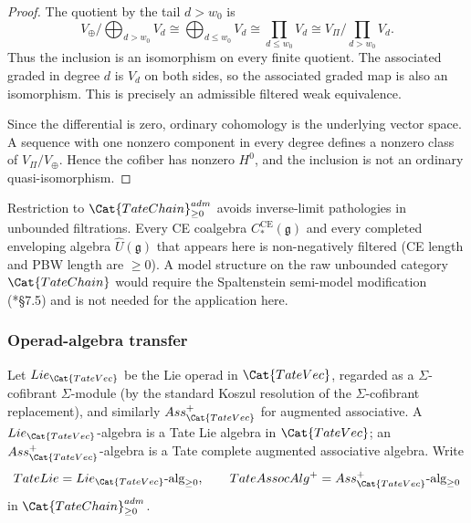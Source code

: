 \begin{proof}
  The quotient by the tail \(d>w_0\) is
  \[
    V_{\oplus}/\bigoplus_{d>w_0}V_d
      \cong \bigoplus_{d\leq w_0}V_d
      \cong \prod_{d\leq w_0}V_d
      \cong V_{\Pi}/\prod_{d>w_0}V_d .
  \]
  Thus the inclusion is an isomorphism on every finite quotient.  The
  associated graded in degree \(d\) is \(V_d\) on both sides, so the
  associated graded map is also an isomorphism.  This is precisely an
  admissible filtered weak equivalence.

  Since the differential is zero, ordinary cohomology is the underlying
  vector space.  A sequence with one nonzero component in every degree
  defines a nonzero class of \(V_{\Pi}/V_{\oplus}\).  Hence the cofiber
  has nonzero \(H^0\), and the inclusion is not an ordinary
  quasi-isomorphism.
\end{proof}

\begin{rmk}
  Restriction to $\Cat{TateChain}_{\geq 0}^{\mathrm{adm}}$ avoids inverse-limit
  pathologies in unbounded filtrations. Every CE coalgebra
  $C_*^{\mathrm{CE}}(\mathfrak g)$ and every completed enveloping
  algebra $\widehat U(\mathfrak g)$ that appears here is
  non-negatively filtered (CE length and PBW length are
  $\geq 0$). A model structure on the raw unbounded category
  $\Cat{TateChain}$ would require the Spaltenstein semi-model
  modification (\cite{lurie-ha}*{\S 7.5}) and is not needed for
  the application here.
\end{rmk}

\subsubsection{Operad-algebra transfer}

Let $\mathrm{Lie}_{\Cat{TateVec}}$ be the Lie operad in
$\Cat{TateVec}$, regarded as a $\Sigma$-cofibrant $\Sigma$-module
(by the standard Koszul resolution of the $\Sigma$-cofibrant
replacement), and similarly $\mathrm{Ass}^+_{\Cat{TateVec}}$ for
augmented associative. A $\mathrm{Lie}_{\Cat{TateVec}}$-algebra is
a Tate Lie algebra in $\Cat{TateVec}$; an
$\mathrm{Ass}^+_{\Cat{TateVec}}$-algebra is a Tate complete
augmented associative algebra. Write
$$\mathrm{TateLie}=\mathrm{Lie}_{\Cat{TateVec}}\text{-alg}_{\geq 0},
  \qquad \mathrm{TateAssocAlg}^+=
  \mathrm{Ass}^+_{\Cat{TateVec}}\text{-alg}_{\geq 0}$$
in $\Cat{TateChain}_{\geq 0}^{\mathrm{adm}}$.

